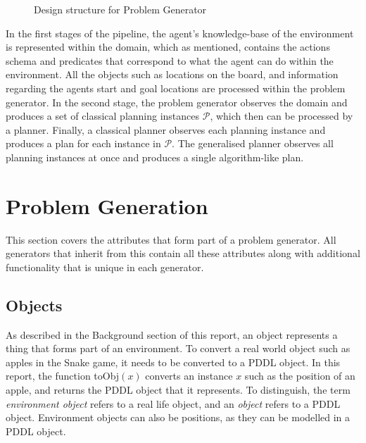 \begin{figure}[h!]
    \caption{Design structure for Problem Generator}
\end{figure}

\noindent In the first stages of the pipeline, the agent's knowledge-base of the environment is represented within the domain, which as mentioned, contains the actions schema and predicates that correspond to what the agent can do within the environment. All the objects such as locations on the board, and information regarding the agents start and goal locations are processed within the problem generator. In the second stage, the problem generator observes the domain and produces a set of classical planning instances $\mathcal{P}$, which then can be processed by a planner. Finally, a classical planner observes each planning instance and produces a plan for each instance in $\mathcal{P}$. The generalised planner observes all planning instances at once and produces a single algorithm-like plan.

\section{Problem Generation}
This section covers the attributes that form part of a problem generator. All generators that inherit from this contain all these attributes along with additional functionality that is unique in each generator.

\subsection{Objects}
As described in the Background section of this report, an object represents a thing that forms part of an environment. To convert a real world object such as apples in the Snake game, it needs to be converted to a PDDL object. In this report, the function toObj$(x)$ converts an instance $x$ such as the position of an apple, and returns the PDDL object that it represents. To distinguish, the term \textit{environment object} refers to a real life object, and an \textit{object} refers to a PDDL object. Environment objects can also be positions, as they can be modelled in a PDDL object.


